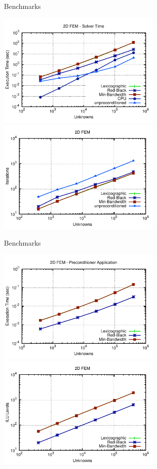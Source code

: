 \begin{frame}{Benchmarks}
  \begin{center}
   \vspace*{-0.4cm}
   \includegraphics[width=0.6\textwidth]{figures/fem2d-solver.pdf} \\[-0.2em]
   \includegraphics[width=0.6\textwidth]{figures/fem2d-iters.pdf}
  \end{center}
\end{frame}

\begin{frame}{Benchmarks}
  \begin{center}
   \vspace*{-0.4cm}
   \includegraphics[width=0.60\textwidth]{figures/fem2d-precond.pdf} \\[-0.2em]
   \includegraphics[width=0.60\textwidth]{figures/fem2d-levels.pdf}
  \end{center}
\end{frame}

